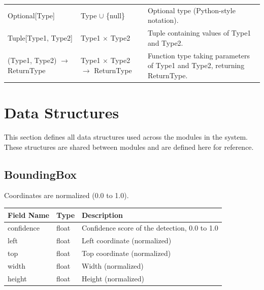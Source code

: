 \documentclass[12pt, titlepage]{article}
\begin{document}
\begin{center}
\begin{tabular}{l l p{6cm}}
    Optional[Type]                          & Type $\cup$ \{null\}                          & Optional type (Python-style notation).                                    \\
    Tuple[Type1, Type2]                     & Type1 $\times$ Type2                          & Tuple containing values of Type1 and Type2.                               \\
    (Type1, Type2) $\rightarrow$ ReturnType & Type1 $\times$ Type2 $\rightarrow$ ReturnType & Function type taking parameters of Type1 and Type2, returning ReturnType. \\
    \bottomrule
  \end{tabular}
\end{center}

\section{Data Structures}

This section defines all data structures used across the modules in the system.
These structures are shared between modules and are defined here for reference.

\subsection{BoundingBox}

Coordinates are normalized (0.0 to 1.0).

\begin{center}
  \begin{tabular}{p{4cm} p{3cm} p{8cm}}
    \toprule
    \textbf{Field Name} & \textbf{Type} & \textbf{Description}                          \\
    \midrule
    confidence          & float         & Confidence score of the detection, 0.0 to 1.0 \\
    left                & float         & Left coordinate (normalized)                  \\
    top                 & float         & Top coordinate (normalized)                   \\
    width               & float         & Width (normalized)                            \\
    height              & float         & Height (normalized)                           \\
    \bottomrule
  \end{tabular}
\end{center}
\end{document}
